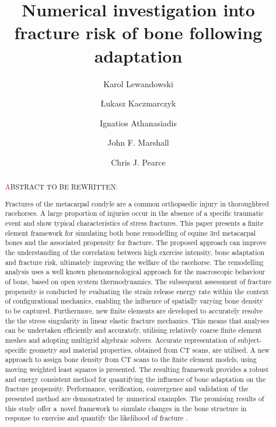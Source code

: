 \documentclass[review]{elsarticle}
\numberwithin{equation}{section}
\begin{document}

\begin{frontmatter}

\title{Numerical investigation into fracture risk of bone following adaptation}

\author[gla]{Karol Lewandowski}
\author[gla]{{\L}ukasz Kaczmarczyk}
\author[gla]{Ignatios Athanasiadis}
\author[gla]{John F. Marshall}
\author[gla]{Chris J. Pearce}
\address[gla]{The James Watt School of Engineering, University of Glasgow, Glasgow, G12 8QQ, UK.}

\begin{abstract}
\textcolor{red} ABSTRACT TO BE REWRITTEN:

	Fractures of the metacarpal condyle are a common orthopaedic injury in thoroughbred racehorses.  
	A large proportion of injuries occur in the absence of a specific traumatic event and show typical characteristics of stress fractures. 
	This paper presents a finite element framework for simulating both bone remodelling of equine 3rd metacarpal bones and the associated propensity for fracture. 
	The proposed approach can improve the understanding of the correlation between high exercise intensity, bone adaptation and fracture 
	risk, ultimately improving the welfare of the racehorse. 
	The remodelling analysis uses a well known phenomenological approach for the macroscopic behaviour of bone, based on open system thermodynamics.  
	The subsequent assessment of fracture propensity is conducted by evaluating the strain release energy rate within the context of configurational mechanics, enabling the influence of spatially varying bone density to be captured.
	Furthermore, new finite elements are developed to accurately resolve the the stress singularity in linear elastic fracture mechanics. This means that analyses can be undertaken efficiently and accurately, utilising relatively coarse finite element meshes and adopting multigrid algebraic solvers.
	Accurate representation of subject-specific geometry and material properties, obtained from CT scans, are utilised. A new approach to assign bone density from CT scans to the finite element models, using moving weighted least squares is presented. 
	The resulting framework provides a robust and energy consistent method for quantifying the influence of bone adaptation on the
	 fracture propensity. Performance, verification, convergence and validation of the presented method are demonstrated by numerical examples.
	The promising results of this study offer a~novel framework to simulate changes in the bone structure in response to exercise and 
	quantify the likelihood of fracture .
\end{abstract}


\end{frontmatter}
\end{document}
